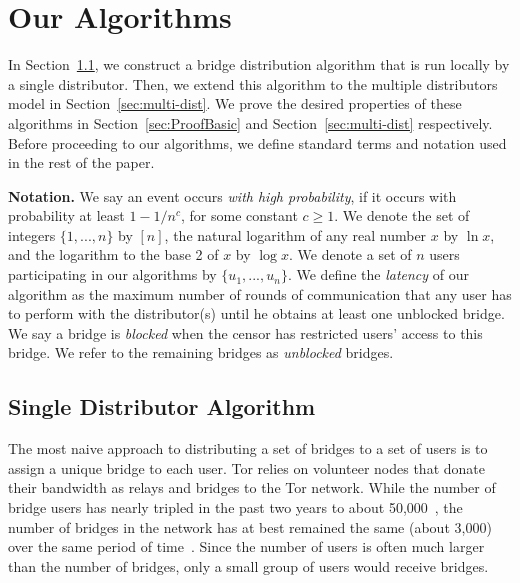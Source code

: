 \documentclass[a4paper,UKenglish]{lipics-v2016}
\newcommand{\fullpaper}[1]{#1}
\newcommand{\fullpaper}[1]{}
\newcommand{\sfsize}{\fontsize{0.68\baselineskip}{0.68\baselineskip}\selectfont}
\newcommand{\sans}[1]{\textbf{\textsf{\sfsize \mbox{#1}}}}
\newcommand{\para}[1]{\vspace{0.55em} \noindent \sans{{\mbox{#1}}}}
\begin{document}
\section{Our Algorithms} \label{sec:algorithm} 
In Section~\ref{sec:basic-alg}, we construct a bridge distribution algorithm that is run locally by a single distributor. Then, we extend this algorithm to the multiple distributors model in Section~\ref{sec:multi-dist}.
We prove the desired properties of these algorithms in Section~\ref{sec:ProofBasic} and Section~\ref{sec:multi-dist} respectively. 
Before proceeding to our algorithms, we define standard terms and notation used in the rest of the paper. 

\para{Notation.} We say an event occurs \emph{with high probability}, if it occurs with probability at least \emph{${1-1/n^c}$}, for some constant ${c \geq 1}$. We denote the set of integers ${\{1,...,n\}}$ by $[n]$, the natural logarithm of any real number $x$ by $\ln{x}$, and the logarithm to the base 2 of $x$ by $\log{x}$. We denote a set of $n$ users participating in our algorithms by ${\{u_1,...,u_n\}}$. We define the \emph{latency} of our algorithm as the maximum number of rounds of communication that any user has to perform with the distributor(s) until he obtains at least one unblocked bridge. \fullpaper{We say a bridge is \emph{blocked} when the censor has restricted users' access to this bridge. We refer to the remaining bridges as \emph{unblocked} bridges.}

\subsection{Single Distributor Algorithm} \label{sec:basic-alg}
The most naive approach to distributing a set of bridges to a set of users is to assign a unique bridge to each user. Tor relies on volunteer nodes that donate their bandwidth as relays and bridges to the Tor network. While the number of bridge users has nearly tripled in the past two years to about 50,000~\cite{Tor:BridgeUsers}, the number of bridges in the network has at best remained the same (about 3,000) over the same period of time~\cite{Tor:Bridges}. Since the number of users is often much larger than the number of bridges, only a small group of users would receive bridges.
\end{document}
